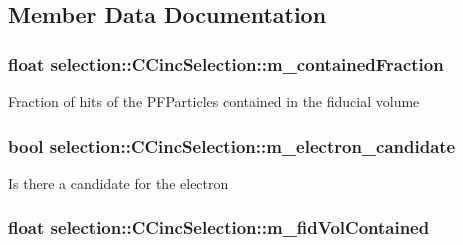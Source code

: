 \subsection{Member Data Documentation}
\hypertarget{classselection_1_1CCincSelection_a5ac3c52c6a88691182c3b3c6594d9744}{
\subsubsection[{m\-\_\-contained\-Fraction}]{\setlength{\rightskip}{0pt plus 5cm}float selection\-::\-C\-Cinc\-Selection\-::m\-\_\-contained\-Fraction\hspace{0.3cm}{\ttfamily [private]}}}\label{classselection_1_1CCincSelection_a5ac3c52c6a88691182c3b3c6594d9744}
Fraction of hits of the P\-F\-Particles contained in the fiducial volume \hypertarget{classselection_1_1CCincSelection_a61b7a5e571eac85c8171a3dbd6ab57c6}{
\subsubsection[{m\-\_\-electron\-\_\-candidate}]{\setlength{\rightskip}{0pt plus 5cm}bool selection\-::\-C\-Cinc\-Selection\-::m\-\_\-electron\-\_\-candidate\hspace{0.3cm}{\ttfamily [private]}}}\label{classselection_1_1CCincSelection_a61b7a5e571eac85c8171a3dbd6ab57c6}
Is there a candidate for the electron \hypertarget{classselection_1_1CCincSelection_a3412d86b03a97a65fed3d5d8a41ed2c0}{
\subsubsection[{m\-\_\-fid\-Vol\-Contained}]{\setlength{\rightskip}{0pt plus 5cm}float selection\-::\-C\-Cinc\-Selection\-::m\-\_\-fid\-Vol\-Contained\hspace{0.3cm}{\ttfamily [private]}}}\label{classselection_1_1CCincSelection_a3412d86b03a97a65fed3d5d8a41ed2c0}
